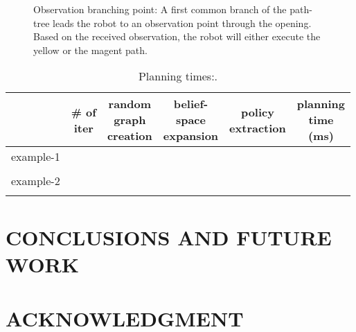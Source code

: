 \documentclass[letterpaper, 10 pt, conference]{ieeeconf}  %
\begin{document}
\begin{figure}[!htb]
 \caption{Observation branching point: A first common branch of the path-tree leads the robot to an observation point through the opening. Based on the received observation, the robot will either execute the yellow or the magent path.}
 \label{fig:example_2_view_point}
\end{figure}






\begin{table}[h]
\begin{center}
\begin{tabular}{|c||c|c|c|c||c|}
\hline
  & \thead{\# of\\ iter} & \thead{random\\graph\\creation} & \thead{belief-\\space\\expansion} & \thead{policy\\ extraction} & \thead{planning\\time\\(ms)} \\
\hline
example-1  & & & & &\\
 & & & & &\\
\hline
example-2  & & & & &\\
 & & & & &\\
\hline
\end{tabular}
\end{center}
\caption{Planning times:.}
\label{tab:table_obstacle_avoidance}
\end{table}


\section{CONCLUSIONS AND FUTURE WORK}







\section*{ACKNOWLEDGMENT}





\end{document}

